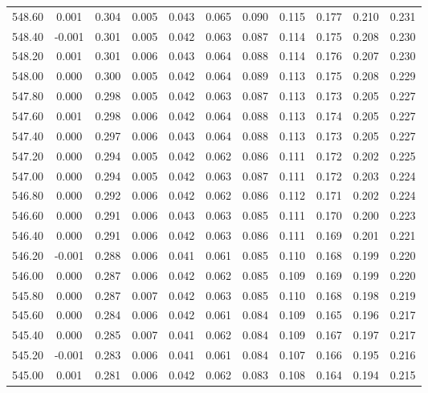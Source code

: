 \begin{longtable}{cccccccccc}
    548.60 &  0.001 &  0.304 &  0.005 &  0.043 &  0.065 &  0.090 &  0.115 &  0.177 &  0.210 &  0.231 \\
    548.40 & -0.001 &  0.301 &  0.005 &  0.042 &  0.063 &  0.087 &  0.114 &  0.175 &  0.208 &  0.230 \\
    548.20 &  0.001 &  0.301 &  0.006 &  0.043 &  0.064 &  0.088 &  0.114 &  0.176 &  0.207 &  0.230 \\
    548.00 &  0.000 &  0.300 &  0.005 &  0.042 &  0.064 &  0.089 &  0.113 &  0.175 &  0.208 &  0.229 \\
    547.80 &  0.000 &  0.298 &  0.005 &  0.042 &  0.063 &  0.087 &  0.113 &  0.173 &  0.205 &  0.227 \\
    547.60 &  0.001 &  0.298 &  0.006 &  0.042 &  0.064 &  0.088 &  0.113 &  0.174 &  0.205 &  0.227 \\
    547.40 &  0.000 &  0.297 &  0.006 &  0.043 &  0.064 &  0.088 &  0.113 &  0.173 &  0.205 &  0.227 \\
    547.20 &  0.000 &  0.294 &  0.005 &  0.042 &  0.062 &  0.086 &  0.111 &  0.172 &  0.202 &  0.225 \\
    547.00 &  0.000 &  0.294 &  0.005 &  0.042 &  0.063 &  0.087 &  0.111 &  0.172 &  0.203 &  0.224 \\
    546.80 &  0.000 &  0.292 &  0.006 &  0.042 &  0.062 &  0.086 &  0.112 &  0.171 &  0.202 &  0.224 \\
    546.60 &  0.000 &  0.291 &  0.006 &  0.043 &  0.063 &  0.085 &  0.111 &  0.170 &  0.200 &  0.223 \\
    546.40 &  0.000 &  0.291 &  0.006 &  0.042 &  0.063 &  0.086 &  0.111 &  0.169 &  0.201 &  0.221 \\
    546.20 & -0.001 &  0.288 &  0.006 &  0.041 &  0.061 &  0.085 &  0.110 &  0.168 &  0.199 &  0.220 \\
    546.00 &  0.000 &  0.287 &  0.006 &  0.042 &  0.062 &  0.085 &  0.109 &  0.169 &  0.199 &  0.220 \\
    545.80 &  0.000 &  0.287 &  0.007 &  0.042 &  0.063 &  0.085 &  0.110 &  0.168 &  0.198 &  0.219 \\
    545.60 &  0.000 &  0.284 &  0.006 &  0.042 &  0.061 &  0.084 &  0.109 &  0.165 &  0.196 &  0.217 \\
    545.40 &  0.000 &  0.285 &  0.007 &  0.041 &  0.062 &  0.084 &  0.109 &  0.167 &  0.197 &  0.217 \\
    545.20 & -0.001 &  0.283 &  0.006 &  0.041 &  0.061 &  0.084 &  0.107 &  0.166 &  0.195 &  0.216 \\
    545.00 &  0.001 &  0.281 &  0.006 &  0.042 &  0.062 &  0.083 &  0.108 &  0.164 &  0.194 &  0.215 \\

\end{longtable}
